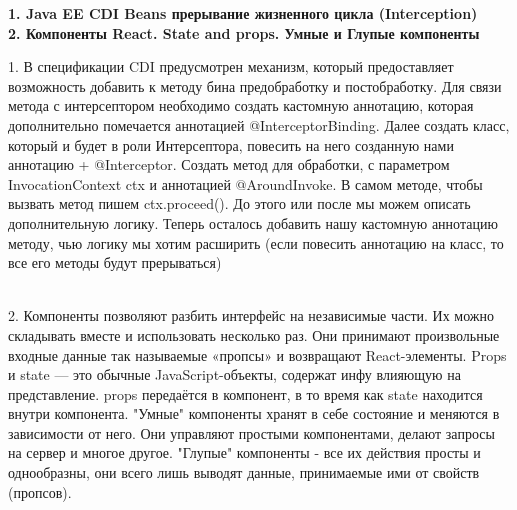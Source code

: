 \documentclass{article}
\newcommand{\bil}[4]{%
    \begin{minipage}{.3\textwidth}
        \textbf{1. #1} \\
        \textbf{2. #2}

        1. #3
        \\
        2. #4
    \end{minipage}
}
\begin{document}
\bil{Java EE CDI Beans прерывание жизненного цикла (Interception)}{Компоненты React. State and props. Умные и Глупые компоненты}{
    В спецификации CDI предусмотрен механизм, который предоставляет возможность добавить к методу бина предобработку и постобработку.
    Для связи метода с интерсептором необходимо создать кастомную аннотацию, которая дополнительно помечается аннотацией @InterceptorBinding.
    Далее создать класс, который и будет в роли Интерсептора, повесить на него созданную нами аннотацию + @Interceptor.
    Создать метод для обработки, с параметром InvocationContext ctx и аннотацией @AroundInvoke. В самом методе, чтобы вызвать метод пишем ctx.proceed(). До этого или после мы можем описать дополнительную логику.
    Теперь осталось добавить нашу кастомную аннотацию методу, чью логику мы хотим расширить (если повесить аннотацию на класс, то все его методы будут прерываться)
}{
    Компоненты позволяют разбить интерфейс на независимые части. Их можно складывать вместе и использовать несколько раз. Они принимают произвольные входные данные так называемые «пропсы» и возвращают React-элементы.
    Props и state — это обычные JavaScript-объекты, содержат инфу влияющую на представление. props передаётся в компонент, в то время как state находится внутри компонента.
    "Умные" компоненты хранят в себе состояние и меняются в зависимости от него. Они управляют простыми компонентами, делают запросы на сервер и многое другое.
    "Глупые" компоненты - все их действия просты и однообразны, они всего лишь выводят данные, принимаемые ими от свойств (пропсов).
}
\hfill
\end{document}
